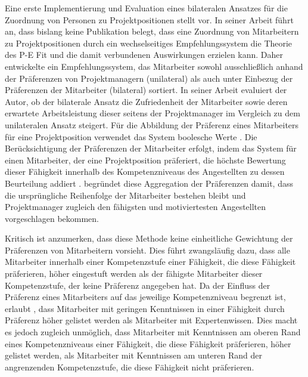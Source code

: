 Eine erste Implementierung und Evaluation eines bilateralen Ansatzes für die Zuordnung von Personen zu Projektpositionen stellt \textcite[S. 1ff.]{link:booklet} vor.
In seiner Arbeit führt \textcite[S. 2]{link:booklet} an, dass bislang keine Publikation belegt, dass eine Zuordnung von Mitarbeitern zu Projektpositionen durch ein wechselseitiges Empfehlungssystem die Theorie des \ac{P-E Fit} und die damit verbundenen Auswirkungen erzielen kann.
Daher entwickelte \textcite[S. 1ff.]{link:booklet} ein Empfehlungssystem, das Mitarbeiter sowohl ausschließlich anhand der Präferenzen von Projektmanagern (unilateral) als auch unter Einbezug der Präferenzen der Mitarbeiter (bilateral) sortiert.
In seiner Arbeit evaluiert der Autor, ob der bilaterale Ansatz die Zufriedenheit der Mitarbeiter sowie deren erwartete Arbeitsleistung dieser seitens der Projektmanager im Vergleich zu dem unilateralen Ansatz steigert.
Für die Abbildung der Präferenz eines Mitarbeiters für eine Projektposition verwendet das System boolesche Werte \cite[S. 69]{link:booklet}.
Die Berücksichtigung der Präferenzen der Mitarbeiter erfolgt, indem das System für einen Mitarbeiter, der eine Projektposition präferiert, die höchste Bewertung dieser Fähigkeit innerhalb des Kompetenzniveaus des Angestellten zu dessen Beurteilung addiert \cite[S. 44]{link:booklet}.
\textcite[S. 44]{link:booklet} begründet diese Aggregation der Präferenzen damit, dass die ursprüngliche Reihenfolge der Mitarbeiter bestehen bleibt und Projektmanager zugleich den fähigsten und motiviertesten Angestellten vorgeschlagen bekommen.

Kritisch ist anzumerken, dass diese Methode keine einheitliche Gewichtung der Präferenzen von Mitarbeitern vorsieht.
Dies führt zwangsläufig dazu, dass alle Mitarbeiter innerhalb einer Kompetenzstufe einer Fähigkeit, die diese Fähigkeit präferieren, höher eingestuft werden als der fähigste Mitarbeiter dieser Kompetenzstufe, der keine Präferenz angegeben hat.
Da der Einfluss der Präferenz eines Mitarbeiters auf das jeweilige Kompetenzniveau begrenzt ist, erlaubt \textcite[S. 1ff.]{link:booklet}, dass Mitarbeiter mit geringen Kenntnissen in einer Fähigkeit durch Präferenz höher gelistet werden als Mitarbeiter mit Expertenwissen.
Dies macht es jedoch zugleich unmöglich, dass Mitarbeiter mit Kenntnissen am oberen Rand eines Kompetenzniveaus einer Fähigkeit, die diese Fähigkeit präferieren, höher gelistet werden, als Mitarbeiter mit Kenntnissen am unteren Rand der angrenzenden Kompetenzstufe, die diese Fähigkeit nicht präferieren.

